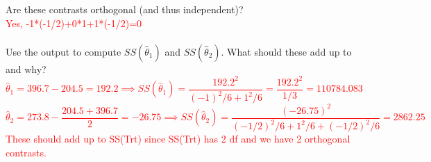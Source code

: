 Are these contrasts orthogonal (and thus independent)?%
\textcolor{red}{\\ Yes, -1*(-1/2)+0*1+1*(-1/2)=0}\\~\\
Use the output to compute $SS(\hat\theta_1)$ and $SS(\hat\theta_2)$.  What should these add up to and why?
\textcolor{red}{
$$\hat{\theta}_1=396.7-204.5=192.2\implies SS(\hat{\theta}_1)=\frac{192.2^2}{(-1)^2/6+1^2/6} = \frac{192.2^2}{1/3} = 110784.083$$
$$\hat{\theta}_2=273.8-\frac{204.5+396.7}{2} = -26.75\implies SS(\hat{\theta}_2)=\frac{(-26.75)^2}{(-1/2)^2/6+1^2/6+(-1/2)^2/6} = 2862.25$$
These should add up to SS(Trt) since SS(Trt) has 2 df and we have 2 orthogonal contrasts.}

\newpage


